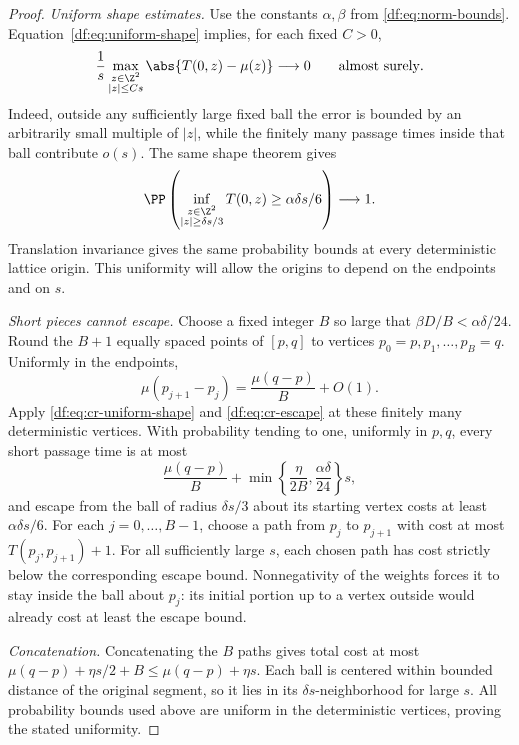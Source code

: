 \begin{proof}
\emph{Uniform shape estimates.}
Use the constants $\alpha,\beta$ from \eqref{df:eq:norm-bounds}.
Equation~\eqref{df:eq:uniform-shape} implies, for each fixed $C>0$,
\begin{equation}\label{df:eq:cr-uniform-shape}
 \frac1s\max_{\substack{z\in\Z^2\\|z|\le Cs}}
       \abs{T(0,z)-\mu(z)}\longrightarrow0
 \qquad\text{almost surely}.
\end{equation}
Indeed, outside any sufficiently large fixed ball the error is bounded by an
arbitrarily small multiple of $|z|$, while the finitely many passage
times inside that ball contribute $o(s)$. The same shape theorem gives
\begin{equation}\label{df:eq:cr-escape}
 \PP\left(
   \inf_{\substack{z\in\Z^2\\|z|\ge\delta s/3}}
       T(0,z)\ge\alpha\delta s/6
       \right)\longrightarrow1.
\end{equation}
Translation invariance gives the same probability bounds at every
deterministic lattice origin. This uniformity will allow the origins to
depend on the endpoints and on $s$.

\emph{Short pieces cannot escape.}
Choose a fixed integer $B$ so large that $\beta D/B<\alpha\delta/24$.
Round the $B+1$ equally spaced points of $[p,q]$ to vertices
$p_0=p,p_1,\ldots,p_B=q$. Uniformly in the endpoints,
\[
 \mu(p_{j+1}-p_j)=\frac{\mu(q-p)}{B}+O(1).
\]
Apply \eqref{df:eq:cr-uniform-shape} and \eqref{df:eq:cr-escape} at these
finitely many deterministic vertices. With probability tending to one,
uniformly in $p,q$, every short passage time is at most
\[
 \frac{\mu(q-p)}B+
       \min\left\{\frac{\eta}{2B},\frac{\alpha\delta}{24}\right\}s,
\]
and escape from the ball of radius $\delta s/3$ about its starting vertex
costs at least $\alpha\delta s/6$. For each $j=0,\ldots,B-1$, choose a path
from $p_j$ to $p_{j+1}$ with cost at most $T(p_j,p_{j+1})+1$.
For all sufficiently large $s$, each chosen path has cost strictly below
the corresponding escape bound. Nonnegativity of the weights forces it
to stay inside the ball about $p_j$: its initial portion up to a vertex
outside would already cost at least the escape bound.

\emph{Concatenation.}
Concatenating the $B$ paths gives total cost
at most $\mu(q-p)+\eta s/2+B\le\mu(q-p)+\eta s$. Each ball is centered
within bounded distance of the original segment, so it lies in its
$\delta s$-neighborhood for large $s$. All probability bounds used above
are uniform in the deterministic vertices, proving the stated uniformity.
\end{proof}

